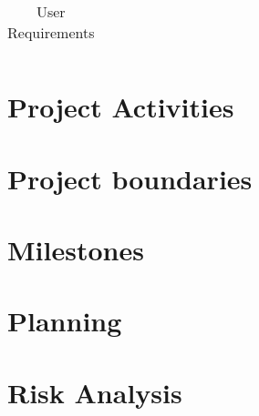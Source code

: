 \documentclass[*]{report}
\begin{document}
\begin{table}
\begin{tabular}{|p{1cm}|l|p{4cm}|l|p{3cm}|l|l|}
\hline
\end{tabular}
\caption{User Requirements}
\end{table}

\chapter{Project Activities}

\chapter{Project boundaries}
\lipsum[2-5]

\chapter{Milestones}
\lipsum[2-5]

\chapter{Planning}
\lipsum[2-5]

\chapter{Risk Analysis}
\lipsum[2-5]
\end{document}
